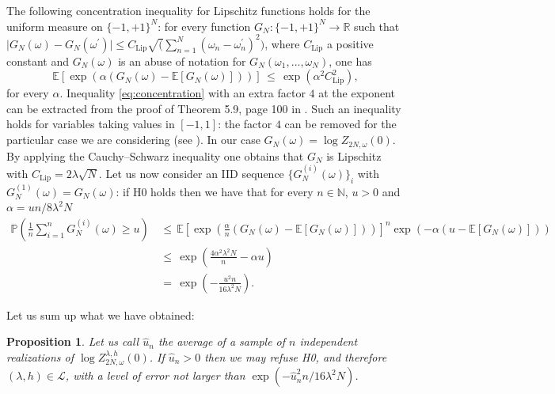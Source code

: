 \documentclass[reqno,11pt]{amsart}
\numberwithin{equation}{section}
\newtheorem{proposition}[theorem]{Proposition}
\newcommand{\R}{\mathbb{R}}
\newcommand{\N}{\mathbb{N}}
\newcommand{\cL}{{\ensuremath{\mathcal L}} }
\newcommand{\bbE}{{\ensuremath{\mathbb E}} }
\newcommand{\bbP}{{\ensuremath{\mathbb P}} }
\newcommand{\ga}{\alpha}
\newcommand{\go}{\omega}
\newcommand{\gl}{\lambda}
\begin{document}
The following concentration inequality for Lipschitz functions holds
for the uniform measure on $\{-1,+1\}^N$: for every
function $G_N:\{-1,+1\}^N \to \R$
such that $\vert G_N(\go)-G_N(\go^\prime )\vert
\le C_{\text{Lip}} \sqrt(\sum_{n=1}^N (\go_n-\go^\prime_n)^2)$, where
$C_{\text{Lip}}$ a positive constant
and $G_N(\go)$ is an abuse of notation for $G_N(\go_1, \ldots, \go_N)$, one has
\begin{equation}
\label{eq:concentration}
\bbE\left[\exp\left(\ga \left(G_N(\go)- \bbE[G_N(\go)]\right)\right)\right]\, \le\,
\exp\left(\ga^2C_{\text{Lip}}^2\right),
\end{equation}
for every $\ga$.
Inequality \eqref{eq:concentration} with an extra factor $4$ at the exponent
can be extracted from the proof of Theorem 5.9, page 100 in \cite{cf:Ledoux}.
Such an inequality holds for variables taking values in $[-1,1]$:
the factor $4$ can be removed for the particular case we are considering
(see \cite[p. 110--111]{cf:Ledoux}).
In our case $G_N(\go)= \log Z_{2N,\go}(0)$. By applying the
 Cauchy--Schwarz inequality one obtains that $G_N$ is Lipschitz with
$C_{\text{Lip}}= 2\gl\sqrt{N}$.
Let us now consider an IID sequence  $\{ G^{(i)}_N(\go)\}_i$
with $G^{(1)}_N (\go)=G_N(\go)$: if H0 holds then we have that for every $n\in \N$, $u>0$
and $\ga= un/8\gl^2N$
\begin{equation}
\begin{split}
\bbP\left(
\frac 1n \sum_{i=1}^n G^{(i)}_N(\go) \ge u
\right)
\, &\le  \,
\bbE\left[
\exp\left(
\frac\ga n \left(G_N(\go)- \bbE[G_N(\go)]\right)
\right)
\right]^n
\exp\left(-\ga\left( u- \bbE[G_N(\go)]\right)\right)
\\
&\le \,
\exp\left(\frac{4 \ga^2 \gl^2N}{n}-\ga u\right)
\\
&= \, \exp\left( -\frac{u^2 n}{16 \gl^2 N}\right) .
\end{split}
\end{equation}


Let us sum up what we have obtained:

\medskip
\begin{proposition}
\label{th:stat}
Let us call $\widehat u_n$ the average of a sample of $n$ independent
realizations of $\log Z_{2N,\go}^{\gl,h}(0)$. If $\widehat u_n>0$ then we may
refuse H0, and therefore  $(\gl,h)\in \cL$, with a level
of error not larger than $\exp\left( -{\widehat u_n ^2 n}/{16 \gl^2 N}\right)$.
\end{proposition}
\medskip
\end{document}

